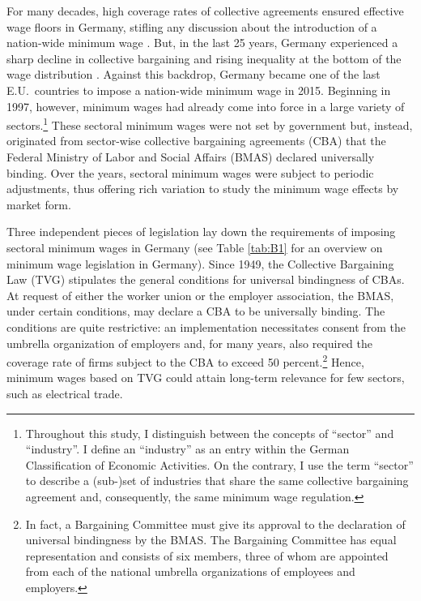 \documentclass[11pt,oneside,reqno,xcolor=dvipsnames]{article} %
\begin{document}
For many decades, high coverage rates of collective agreements ensured effective wage floors in Germany, stifling any discussion about the introduction of a nation-wide minimum wage \citep{BachmannEtAl2014}. But, in the last 25 years, Germany experienced a sharp decline in collective bargaining and rising inequality at the bottom of the wage distribution \citep{DustmannEtAl2009}. Against this backdrop, Germany became one of the last E.U.\ countries to impose a nation-wide minimum wage in 2015. Beginning in 1997, however, minimum wages had already come into force in a large variety of sectors.\footnote{Throughout this study, I distinguish between the concepts of ``sector'' and ``industry''. I define an ``industry'' as an entry within the German Classification of Economic Activities. On the contrary, I use the term ``sector'' to describe a (sub-)set of industries that share the same collective bargaining agreement and, consequently, the same minimum wage regulation.} These sectoral minimum wages were not set by government but, instead, originated from sector-wise collective bargaining agreements (CBA) that the Federal Ministry of Labor and Social Affairs (BMAS) declared universally binding. Over the years, sectoral minimum wages were subject to periodic adjustments, thus offering rich variation to study the minimum wage effects by market form.

Three independent pieces of legislation lay down the requirements of imposing sectoral minimum wages in Germany (see Table \ref{tab:B1} for an overview on minimum wage legislation in Germany). Since 1949, the Collective Bargaining Law (TVG) stipulates the general conditions for universal bindingness of CBAs. At request of either the worker union or the employer association, the BMAS, under certain conditions, may declare a CBA to be universally binding. The conditions are quite restrictive: an implementation necessitates consent from the umbrella organization of employers and, for many years, also required the coverage rate of firms subject to the CBA to exceed 50 percent.\footnote{In fact, a Bargaining Committee must give its approval to the declaration of universal bindingness by the BMAS. The Bargaining Committee has equal representation and consists of six members, three of whom are appointed from each of the national umbrella organizations of employees and employers.} Hence, minimum wages based on TVG could attain long-term relevance for few sectors, such as electrical trade.
\end{document}
